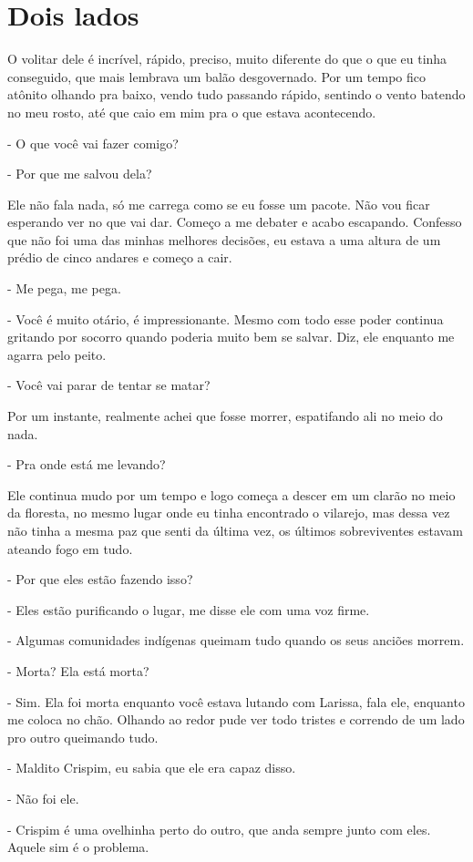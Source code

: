 \chapter{Dois lados}
O volitar dele é incrível, rápido, preciso, muito diferente do que o que eu tinha conseguido, que mais lembrava um balão desgovernado. Por um tempo fico atônito olhando pra baixo, vendo tudo passando rápido, sentindo o vento batendo no meu rosto, até que caio em mim pra o que estava acontecendo.

- O que você vai fazer comigo?

-  Por que me salvou dela?

Ele não fala nada, só me carrega como se eu fosse um pacote. Não vou ficar esperando ver no que vai dar. Começo a me debater e acabo escapando. Confesso que não foi uma das minhas melhores decisões, eu estava a uma altura de um prédio de cinco andares e começo a cair.

- Me pega, me pega.

- Você é muito otário, é impressionante. Mesmo com todo esse poder continua gritando por socorro quando poderia muito bem se salvar. Diz, ele enquanto me agarra pelo peito.

- Você vai parar de tentar se matar?

Por um instante, realmente achei que fosse morrer, espatifando ali no meio do nada.

- Pra onde está me levando?

Ele continua mudo por um tempo e logo começa a descer em um clarão no meio da floresta, no mesmo lugar onde eu tinha encontrado o vilarejo, mas dessa vez não tinha a mesma paz que senti da última vez, os últimos sobreviventes estavam ateando fogo em tudo.

- Por que eles estão fazendo isso?

- Eles estão purificando o lugar, me disse ele com uma voz firme.

- Algumas comunidades indígenas queimam tudo quando os seus anciões morrem.

- Morta? Ela está morta?

- Sim. Ela foi morta enquanto você estava lutando com Larissa, fala ele, enquanto me coloca no chão. Olhando ao redor pude ver todo tristes e correndo de um lado pro outro queimando tudo.

- Maldito Crispim, eu sabia que ele era capaz disso.

- Não foi ele.

- Crispim é uma ovelhinha perto do outro, que anda sempre junto com eles. Aquele sim é o problema.

